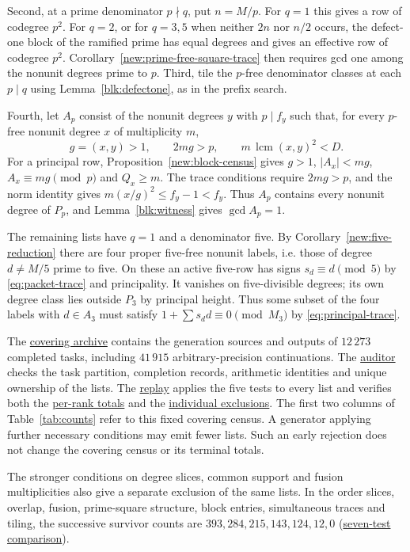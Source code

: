 \documentclass[11pt]{amsart}
\numberwithin{equation}{section}
\theoremstyle{definition}
\theoremstyle{plain}
\DeclareMathOperator{\lcm}{lcm}
\newcommand{\supfile}[2]{\href{run:rank-bound-supplement/#1}{#2}}
\begin{document}
Second, at a prime denominator $p\nmid q$, put $n=M/p$. For $q=1$ this
gives a row of codegree $p^2$. For $q=2$, or for $q=3,5$ when neither
$2n$ nor $n/2$ occurs, the defect-one block of the ramified prime has
equal degrees and gives an effective row of codegree $p^2$.
Corollary~\ref{new:prime-free-square-trace} then requires gcd one
among the nonunit degrees prime to $p$.
Third, tile the $p$-free denominator classes at each $p\mid q$
using Lemma~\ref{blk:defectone}, as in the prefix search.

Fourth, let $A_p$ consist of the nonunit degrees $y$ with $p\mid f_y$ such
that, for every $p$-free nonunit degree $x$ of multiplicity $m$,
\[
 g=(x,y)>1,\qquad 2mg>p,\qquad m\,\lcm(x,y)^2<D .
\]
For a principal row, Proposition~\ref{new:block-census} gives
$g>1$, $|A_x|<mg$, $A_x\equiv mg\pmod p$ and $Q_x\ge m$.
The trace conditions require $2mg>p$, and the norm identity gives
$m(x/g)^2\le f_y-1<f_y$. Thus $A_p$ contains every nonunit
degree of $P_p$, and Lemma~\ref{blk:witness} gives $\gcd A_p=1$.

The remaining lists have $q=1$ and a denominator five. By
Corollary~\ref{new:five-reduction} there are four proper five-free
nonunit labels, i.e. those of degree $d\ne M/5$ prime to five.
On these an active five-row has signs $s_d\equiv d\pmod5$
by \eqref{eq:packet-trace} and principality. It vanishes on
five-divisible degrees; its own degree class lies outside $P_3$
by principal height. Thus some subset of the four labels with
$d\in A_3$ must satisfy $1+\sum s_d d\equiv0\pmod{M_3}$
by \eqref{eq:principal-trace}.

The \supfile{census/reference-census.zip}{covering archive} contains
the generation sources and outputs of $12\,273$ completed tasks,
including $41\,915$ arbitrary-precision continuations. The
\supfile{census/audit.py}{auditor} checks the task partition, completion
records, arithmetic identities and unique ownership of the lists.
The \supfile{census/five_tests.py}{replay}
applies the five tests to every list and verifies both the
\supfile{census/rank-counts.json}{per-rank totals} and the
\supfile{census/rank-dispositions.jsonl.gz}{individual exclusions}.
The first two columns of Table~\ref{tab:counts} refer to this fixed
covering census. A generator applying further necessary conditions
may emit fewer lists. Such an early rejection does not change the
covering census or its terminal totals.

The stronger conditions on degree slices, common support and fusion
multiplicities also give a separate exclusion of the same lists.
In the order slices, overlap, fusion, prime-square structure, block
entries, simultaneous traces and tiling, the successive survivor counts
are $393,284,215,143,124,12,0$
(\supfile{census/recheck.py}{seven-test comparison}).
\end{document}
